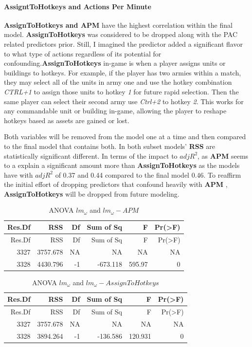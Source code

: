 \documentclass[]{article}
\let\oldparagraph\paragraph
\renewcommand{\paragraph}[1]{\oldparagraph{#1}\mbox{}}
\begin{document}
\hypertarget{assignttohotkeys-and-actions-per-minute}{%
\paragraph{AssigntToHotkeys and Actions Per
Minute}\label{assignttohotkeys-and-actions-per-minute}}

\textbf{AssignToHotkeys and APM} have the highest correlation within the
final model. \textbf{AssignToHotkeys} was considered to be dropped along
with the PAC related predictors prior. Still, I imagined the predictor
added a significant flavor to what type of actions regardless of its
potential for confounding.\textbf{AssignToHotkeys} in-game is when a
player assigns units or buildings to hotkeys. For example, if the player
has two armies within a match, they may select all of the units in army
one and use the hotkey combination \emph{CTRL+1} to assign those units
to hotkey \emph{1} for future rapid selection. Then the same player can
select their second army use \emph{Ctrl+2} to hotkey \emph{2}. This
works for any commandable unit or building in-game, allowing the player
to reshape hotkeys based as assets are gained or lost.

Both variables will be removed from the model one at a time and then
compared to the final model that contains both. In both subset models'
\textbf{RSS} are statistically significant different. In terms of the
impact to \(adjR^2\), as \textbf{APM} seems to a explain a significant
amount more than \textbf{AssignToHotkeys} as the models have with
\(adjR^2\) of 0.37 and 0.44 compared to the final model 0.46. To
reaffirm the initial effort of dropping predictors that confound heavily
with \textbf{APM} , \textbf{AssignToHotkeys} will be dropped from future
modeling.

\begin{longtable}[]{@{}rrrrrr@{}}
\caption{ANOVA \(lm_\omega\) and \(lm_\omega-APM\)}\tabularnewline
\toprule
Res.Df & RSS & Df & Sum of Sq & F & Pr(\textgreater{}F)\tabularnewline
\midrule
\endfirsthead
\toprule
Res.Df & RSS & Df & Sum of Sq & F & Pr(\textgreater{}F)\tabularnewline
\midrule
\endhead
3327 & 3757.678 & NA & NA & NA & NA\tabularnewline
3328 & 4430.796 & -1 & -673.118 & 595.97 & 0\tabularnewline
\bottomrule
\end{longtable}

\begin{longtable}[]{@{}rrrrrr@{}}
\caption{ANOVA \(lm_\omega\) and
\(lm_\omega-AssignToHotkeys\)}\tabularnewline
\toprule
Res.Df & RSS & Df & Sum of Sq & F & Pr(\textgreater{}F)\tabularnewline
\midrule
\endfirsthead
\toprule
Res.Df & RSS & Df & Sum of Sq & F & Pr(\textgreater{}F)\tabularnewline
\midrule
\endhead
3327 & 3757.678 & NA & NA & NA & NA\tabularnewline
3328 & 3894.264 & -1 & -136.586 & 120.931 & 0\tabularnewline
\bottomrule
\end{longtable}
\end{document}
